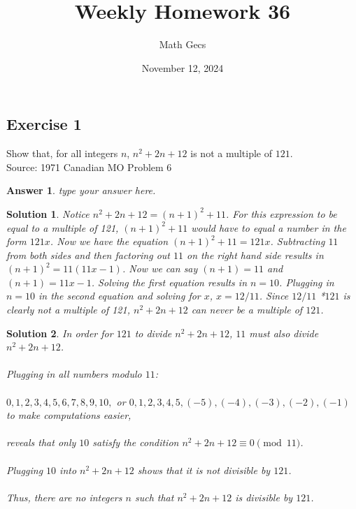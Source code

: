 \documentclass[12pt]{article}
\title{Weekly Homework 36}
\author{Math Gecs}
\date{November 12, 2024}
\newtheorem*{answer*}{Answer}
\newtheorem*{solution*}{Solution}
\begin{document}
\maketitle

\subsection*{Exercise 1}
Show that, for all integers $n$, $n^2+2n+12$ is not a multiple of $121$.\\

Source: 1971 Canadian MO Problem 6\\

\begin{answer*}
type your answer here.
\end{answer*}

\begin{solution*}
Notice $n^{2} + 2n + 12 = (n+1)^{2} + 11$. For this expression to be equal to a multiple of 121, $(n+1)^{2} + 11$ would have to equal a number in the form $121x$. Now we have the equation $(n+1)^{2} + 11 = 121x$. Subtracting $11$ from both sides and then factoring out $11$ on the right hand side results in $(n+1)^{2} = 11(11x - 1)$. Now we can say $(n+1) = 11$ and $(n+1) = 11x - 1$. Solving the first equation results in $n=10$. Plugging in $n=10$ in the second equation and solving for $x$, $x = 12/11$. Since $12/11$ *$121$ is clearly not a multiple of 121, $n^{2} + 2n + 12$ can never be a multiple of $121$.
\end{solution*}

\begin{solution*}
In order for $121$ to divide $n^{2} + 2n + 12$, $11$ must also divide $n^{2} + 2n + 12$.
\\ \\
Plugging in all numbers modulo $11$:
\\ \\
$0, 1, 2, 3, 4, 5, 6, 7, 8, 9, 10,$ or $0, 1, 2, 3, 4, 5, (-5), (-4), (-3), (-2), (-1)$ to make computations easier,
\\ \\
reveals that only $10$ satisfy the condition ${n^{2} + 2n + 12} \equiv 0 \pmod{11}$.
\\ \\
Plugging $10$ into ${n^{2} + 2n + 12}$ shows that it is not divisible by $121$.
\\ \\
Thus, there are no integers $n$ such that $n^{2} + 2n + 12$ is divisible by $121$.
\end{solution*}
\end{document}
